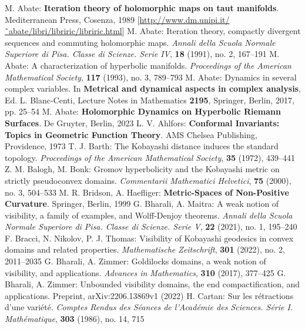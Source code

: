 \begin{thebibliography}{widest entry}
   M. Abate: \textbf{Iteration theory of holomorphic maps on taut manifolds}. Mediterranean Press, Cosenza, 1989 [\url{http://www.dm.unipi.it/˜abate/libri/libriric/libriric.html}]
   M. Abate: Iteration theory, compactly divergent sequences and commuting holomorphic maps. \textit{Annali della Scuola Normale Superiore di Pisa. Classe di Scienze. Serie IV}, \textbf{18} (1991), no. 2, 167--191
   M. Abate: A characterization of hyperbolic manifolds. \textit{Proceedings of the American Mathematical Society}, \textbf{117} (1993), no. 3, 789--793
   M. Abate: Dynamics in several complex variables. In \textbf{Metrical and dynamical aspects in complex analysis}, Ed. L. Blanc-Centi, Lecture Notes in Mathematics \textbf{2195}, Springer, Berlin, 2017, pp. 25--54
   M. Abate: \textbf{Holomorphic Dynamics on Hyperbolic Riemann Surfaces}. De Gruyter, Berlin, 2023
   L. V. Ahlfors: \textbf{Conformal Invariants: Topics in Geometric Function Theory}. AMS Chelsea Publishing, Providence, 1973
   T. J. Barth: The Kobayashi distance induces the standard topology. \textit{Proceedings of the American Mathematical Society}, \textbf{35} (1972), 439--441
   Z. M. Balogh, M. Bonk: Gromov hyperbolicity and the Kobayashi metric on strictly pseudoconvex domains. \textit{Commentarii Mathematici Helvetici}, \textbf{75} (2000), no. 3, 504--533
   M. R. Bridson, A. Haefliger: \textbf{Metric-Spaces of Non-Positive Curvature}. Springer, Berlin, 1999
   G. Bharali, A. Maitra: A weak notion of visibility, a family of examples, and Wolff-Denjoy theorems. \textit{Annali della Scuola Normale Superiore di Pisa. Classe di Scienze. Serie V}, \textbf{22} (2021), no. 1, 195--240
   F. Bracci, N. Nikolov, P. J. Thomas: Visibility of Kobayashi geodesics in convex domains and related properties. \textit{Mathematische Zeitschrift}, \textbf{301} (2022), no. 2, 2011--2035
   G. Bharali, A. Zimmer: Goldilocks domains, a weak notion of visibility, and applications. \textit{Advances in Mathematics}, \textbf{310} (2017), 377--425
   G. Bharali, A. Zimmer: Unbounded visibility domains, the end compactification, and applications. Preprint, arXiv:2206.13869v1 (2022)
   H. Cartan: Sur les rétractions d'une variété. \textit{Comptes Rendus des Séances de l'Académie des Sciences. Série I. Mathématique}, \textbf{303} (1986), no. 14, 715

\end{thebibliography}
